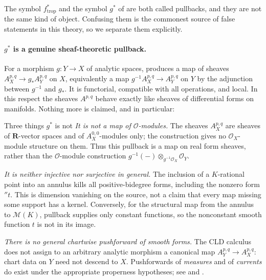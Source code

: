 The symbol $f_{\mathrm{trop}}^*$ and the symbol $g^*$ of
 are both called pullbacks, and they are not the
same kind of object.  Confusing them is the commonest source of false
statements in this theory, so we separate them explicitly.

\paragraph{$g^*$ is a genuine sheaf-theoretic pullback.}
For a morphism $g:Y\to X$ of analytic spaces,
 produces a map of sheaves
$A^{p,q}_X\to g_*A^{p,q}_Y$ on $X$, equivalently a map
$g^{-1}A^{p,q}_X\to A^{p,q}_Y$ on $Y$ by the adjunction between $g^{-1}$ and
$g_*$.  It is functorial, compatible with all operations, and local.  In this
respect the sheaves $A^{p,q}$ behave exactly like sheaves of differential
forms on manifolds.  Nothing more is claimed, and in particular:

\begin{warning}{Three things $g^*$ is not}
\emph{It is not a map of $\mathcal O$-modules.}  The sheaves $A^{p,q}_X$ are
sheaves of $\mathbf R$-vector spaces and of $A^{0,0}_X$-modules only;
the construction gives no $\mathcal O_X$-module structure on them.
Thus this pullback is a map on real form sheaves, rather than the
$\mathcal O$-module construction
$g^{-1}(-)\otimes_{g^{-1}\mathcal O_X}\mathcal O_Y$.

\emph{It is neither injective nor surjective in general.}  The inclusion
of a $K$-rational point into an annulus kills all positive-bidegree forms,
including the nonzero form $\dprime t$.  This is dimension vanishing on
the source, not a claim that every map missing some support has a kernel.
Conversely, for the structural map from the annulus to $\mathscr M(K)$,
pullback supplies only constant functions, so the nonconstant smooth
function $t$ is not in its image.

\emph{There is no general chartwise pushforward of smooth forms.}  The CLD
calculus does not assign to an arbitrary analytic morphism a canonical map
$A^{p,q}_Y\to A^{p,q}_X$: chart data on $Y$ need not descend to $X$.
Pushforwards of \emph{measures} and of \emph{currents} do exist under the
appropriate properness hypotheses; see
 and .
\end{warning}

